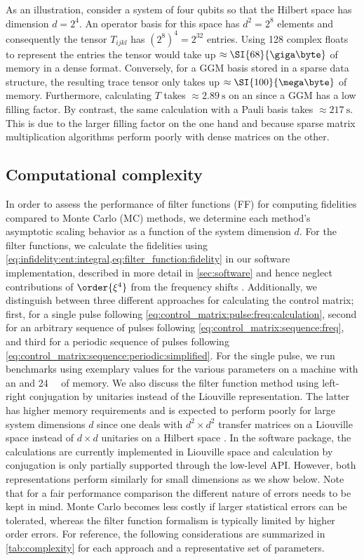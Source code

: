 As an illustration, consider a system of four qubits so that the Hilbert space has dimension $d = 2^4$. An operator basis for this space has $d^2 = 2^8$ elements and consequently the tensor $T_{ijkl}$ has $(2^8)^4 = 2^{32}$ entries. Using \SI{128}{\bit} complex floats to represent the entries the tensor would take up $\approx\SI{68}{\giga\byte}$ of memory in a dense format. Conversely, for a GGM basis stored in a sparse data structure, the resulting trace tensor only takes up $\approx\SI{100}{\mega\byte}$ of memory. Furthermore, calculating $T$ takes $\approx\SI{2.89}{\second}$ on an \fastprocessor since a GGM has a low filling factor. By contrast, the same calculation with a Pauli basis takes $\approx\SI{217}{\second}$. This is due to the larger filling factor on the one hand and because sparse matrix multiplication algorithms perform poorly with dense matrices on the other.

\subsection{Computational complexity}\label{sec:performance:complexity}
In order to assess the performance of filter functions (FF) for computing fidelities compared to Monte Carlo (MC) methods, we determine each method's asymptotic scaling behavior as a function of the system dimension $d$. For the filter functions, we calculate the fidelities using \cref{eq:infidelity:ent:integral,eq:filter_function:fidelity} in our software implementation, described in more detail in \cref{sec:software} and hence neglect contributions of $\order{\xi^4}$ from the frequency shifts \freqshifts. Additionally, we distinguish between three different approaches for calculating the control matrix; first, for a single pulse following \cref{eq:control_matrix:pulse:freq:calculation}, second for an arbitrary sequence of pulses following \cref{eq:control_matrix:sequence:freq}, and third for a periodic sequence of pulses following \cref{eq:control_matrix:sequence:periodic:simplified}. For the single pulse, we run benchmarks using exemplary values for the various parameters on a machine with an \slowprocessor and \SI{24}{\giga\byte} of memory. We also discuss the filter function method using left-right conjugation by unitaries instead of the Liouville representation. The latter has higher memory requirements and is expected to perform poorly for large system dimensions $d$ since one deals with $d^2\times d^2$ transfer matrices on a Liouville space \Lspace instead of $d\times d$ unitaries on a Hilbert space \Hspace. In the software package, the calculations are currently implemented in Liouville space and calculation by conjugation is only partially supported through the low-level API. However, both representations perform similarly for small dimensions as we show below. Note that for a fair performance comparison the different nature of errors needs to be kept in mind. Monte Carlo becomes less costly if larger statistical errors can be tolerated, whereas the filter function formalism is typically limited by higher order errors. For reference, the following considerations are summarized in \cref{tab:complexity} for each approach and a representative set of parameters.

